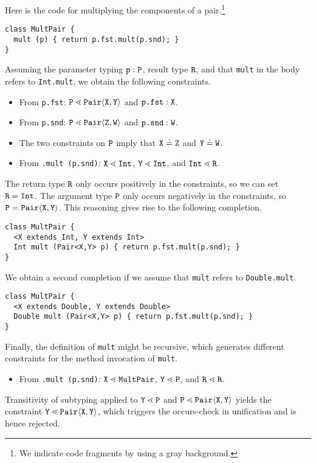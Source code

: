 Here is the \TFGJ code  for multiplying the components of a
pair.\footnote{We indicate \TFGJ code fragments by using a
  {gray background}.}
\begin{lstlisting}[style=tfgj]
class MultPair {
  mult (p) { return p.fst.mult(p.snd); }
}
\end{lstlisting}
Assuming the parameter typing ${\tt p}:{\tt P}$, result type ${\tt R}$, and that
\texttt{mult} in the body refers to \texttt{Int.mult}, we
obtain the following constraints.
\begin{itemize}
\item From \texttt{p.fst}: ${\tt P} \lessdot \mathtt{Pair}\langle{\tt X},{\tt Y}\rangle$ and
  $\texttt{p.fst} : {\tt X}$.
\item From \texttt{p.snd}: ${\tt P} \lessdot \mathtt{Pair}\langle{\tt Z},{\tt W}\rangle$ and
  $\texttt{p.snd} : {\tt W}$.
\item The two constraints on ${\tt P}$ imply that ${\tt X} \doteq {\tt Z}$ and
  ${\tt Y} \doteq {\tt W}$.
\item From \texttt{.mult (p.snd)}: ${\tt X} \lessdot \mathtt{Int}$, ${\tt Y} \lessdot
  \mathtt{Int}$, and $\mathtt{Int} \lessdot {\tt R}$.
\end{itemize}
The return type ${\tt R}$ only occurs positively in the constraints, so we can
set ${\tt R} = \mathtt{Int}$.
The argument type ${\tt P}$ only occurs negatively in the constraints,
so ${\tt P} = \mathtt{Pair} \langle{\tt X},{\tt Y}\rangle$.
This reasoning gives rise to the following completion.
\begin{lstlisting}[style=fgj]
class MultPair {
  <X extends Int, Y extends Int>
  Int mult (Pair<X,Y> p) { return p.fst.mult(p.snd); }
}
\end{lstlisting}
We obtain a second completion if we assume that \texttt{mult} refers to
\texttt{Double.mult}.
\begin{lstlisting}[style=fgj]
class MultPair {
  <X extends Double, Y extends Double>
  Double mult (Pair<X,Y> p) { return p.fst.mult(p.snd); }
}
\end{lstlisting}

Finally, the definition of \texttt{mult} might be recursive, which
generates different constraints for the method invocation of \texttt{mult}.
\begin{itemize}
\item From \texttt{.mult (p.snd)}: ${\tt X} \lessdot \mathtt{MultPair}$, ${\tt Y} \lessdot
  \mathtt{P}$, and $\mathtt{R} \lessdot {\tt R}$.
\end{itemize}
Transitivity of subtyping applied to ${\tt Y} \lessdot \mathtt{P}$ and ${\tt P} \lessdot \mathtt{Pair}\langle{\tt X},{\tt Y}\rangle$
yields the constraint ${\tt Y} \lessdot \mathtt{Pair}\langle{\tt X},{\tt Y}\rangle$, which triggers the
occurs-check in unification and is hence rejected. 

